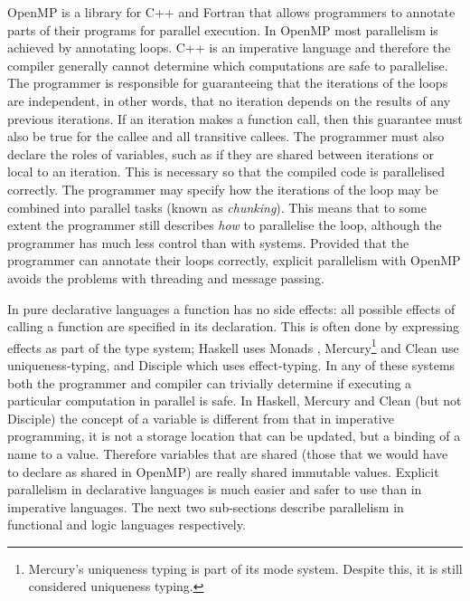 OpenMP \citep{openmp} is a library for C++
and Fortran
that allows programmers to annotate parts of their programs for parallel
execution.
In OpenMP most parallelism is achieved by annotating loops.
C++ is an imperative language and therefore the compiler generally cannot
determine which computations are safe to parallelise.
The programmer is responsible for guaranteeing that the iterations
of the loops are independent,
in other words, that no iteration depends on the results of any previous
iterations.
If an iteration makes a function call, then this guarantee must also be true for
the callee and all transitive callees.
The programmer must also declare the roles of variables,
such as if they are shared between iterations or local to an iteration.
This is necessary so that the compiled code is parallelised correctly.
The programmer may specify how the iterations of the loop may be
combined into parallel tasks (known as \emph{chunking}).
This means that to some extent the programmer still describes \emph{how} to
parallelise the loop,
although the programmer has much less control than with \pvc systems.
Provided that the programmer can annotate their loops correctly,
explicit parallelism with OpenMP avoids the problems
with threading and message passing.

In pure declarative languages
a function has no side effects:
all possible effects of calling a function are specified in its 
declaration.
This is often done by expressing effects as part of the type system;
Haskell \citep{haskell98} uses Monads \citep{haskell-monads},
Mercury\footnote{
    Mercury's uniqueness typing is part of its mode system.
    Despite this, it is still considered uniqueness typing.}
\citep{mercury_jlp}
and Clean \citep{brus:1987:clean}
use
uniqueness-typing, and 
Disciple \citep{ddc} which uses effect-typing.
In any of these systems both the programmer and compiler can trivially
determine if executing a particular computation in parallel is safe.
In Haskell, Mercury and Clean (but not Disciple)
the concept of a variable is different from that in imperative programming,
it is not a storage location that can be updated,
but a binding of a name to a value.
Therefore variables that are shared
(those that we would have to declare as shared in OpenMP)
are really shared immutable values.
Explicit parallelism in declarative languages is much easier and safer to use
than in imperative languages.
The next two sub-sections describe parallelism in functional and logic
languages respectively.

